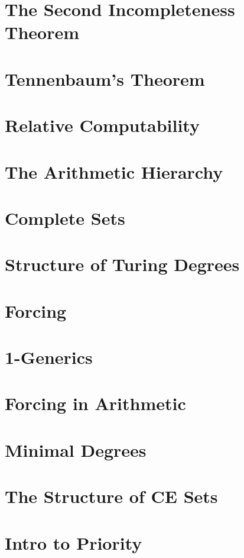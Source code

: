 \documentclass{book}
\begin{document}
\chapter{The Second Incompleteness Theorem}

\chapter{Tennenbaum's Theorem}

\chapter{Relative Computability}

\chapter{The Arithmetic Hierarchy}

\chapter{Complete Sets}

\chapter{Structure of Turing Degrees}

\chapter{Forcing}

\chapter{1-Generics}

\chapter{Forcing in Arithmetic}

\chapter{Minimal Degrees}

\chapter{The Structure of CE Sets}

\chapter{Intro to Priority}
\end{document}
